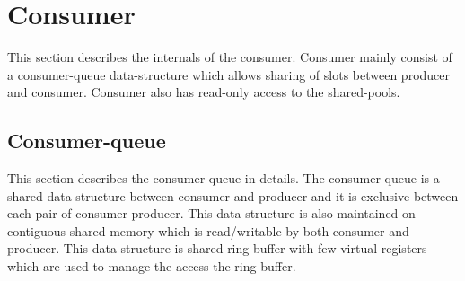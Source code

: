 \documentclass[a4paper,twoside]{report} %
\begin{document}
\section{Consumer}
This section describes the internals of the consumer.  Consumer mainly
consist of a consumer-queue data-structure which allows sharing of
slots between producer and consumer.  Consumer also has read-only 
access to the shared-pools.


\subsection{Consumer-queue}
\label{sec:consumer-queue}
This section describes the consumer-queue in details.
The consumer-queue is a shared data-structure between consumer and
producer and it is exclusive between each pair of consumer-producer.
This data-structure is also maintained on contiguous shared memory 
which is read/writable by both consumer and producer.  This
data-structure is shared ring-buffer with few virtual-registers 
which are used to manage the access the ring-buffer.
\end{document}
